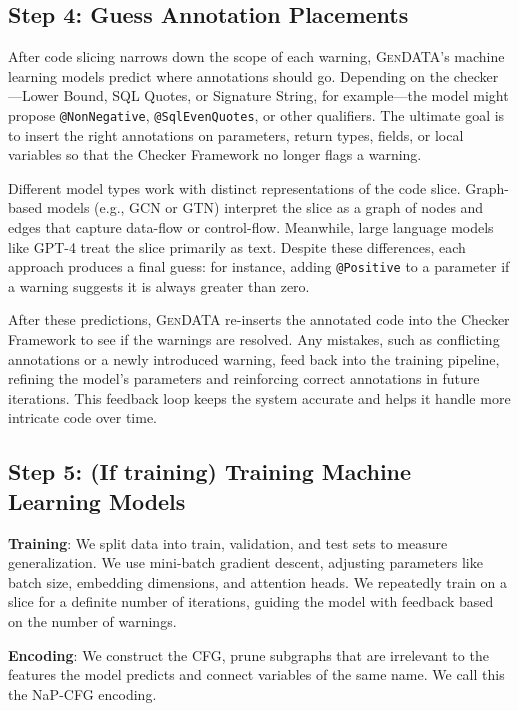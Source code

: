 \documentclass[acmsmall,screen,review,anonymous]{acmart}
\makeatletter
\newcommand{\gendata}{\textsc{GenDATA}\xspace}
\newcommand{\cf}{Checker Framework\xspace}
\newcommand{\atmark}[1]{\texttt{@#1}}
\makeatother
\begin{document}
\subsection{Step 4: Guess Annotation Placements}
\label{sec:step4}

After code slicing narrows down the scope of each warning, \gendata's machine learning models predict where annotations should go. Depending on the checker---Lower Bound, SQL Quotes, or Signature String, for example---the model might propose \atmark{NonNegative}, \atmark{SqlEvenQuotes}, or other qualifiers. The ultimate goal is to insert the right annotations on parameters, return types, fields, or local variables so that the \cf no longer flags a warning.

Different model types work with distinct representations of the code slice. Graph-based models (e.g., GCN or GTN) interpret the slice as a graph of nodes and edges that capture data-flow or control-flow. Meanwhile, large language models like GPT-4 treat the slice primarily as text. Despite these differences, each approach produces a final guess: for instance, adding \atmark{Positive} to a parameter if a warning suggests it is always greater than zero.

After these predictions, \gendata re-inserts the annotated code into the \cf to see if the warnings are resolved. Any mistakes, such as conflicting annotations or a newly introduced warning, feed back into the training pipeline, refining the model's parameters and reinforcing correct annotations in future iterations. This feedback loop keeps the system accurate and helps it handle more intricate code over time.

\subsection{Step 5: (If training) Training Machine Learning Models}
\label{sec:step5}

\textbf{Training}: We split data into train, validation, and test sets to measure generalization. We use mini-batch gradient descent, adjusting parameters like batch size, embedding dimensions, and attention heads. We repeatedly train on a slice for a definite number of iterations, guiding the model with feedback based on the number of warnings.

\textbf{Encoding}: We construct the CFG, prune subgraphs that are irrelevant to the features the model predicts and connect variables of the same name. We call this the NaP-CFG encoding.
\end{document}
